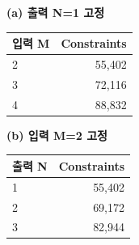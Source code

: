 \par\medskip\noindent
\begin{minipage}[t]{.49\linewidth}\centering
{\small\setlength{\tabcolsep}{3pt}\renewcommand{\arraystretch}{1.12}
\textbf{(a) 출력 N=1 고정}\par\smallskip
\begin{tabular}{@{}lr@{}}\toprule
\textbf{입력 M} & \textbf{Constraints} \\
\midrule
2 & 55,402 \\
3 & 72,116 \\
4 & 88,832 \\
\bottomrule\end{tabular}}
\end{minipage}\hfill
\begin{minipage}[t]{.49\linewidth}\centering
{\small\setlength{\tabcolsep}{3pt}\renewcommand{\arraystretch}{1.12}
\textbf{(b) 입력 M=2 고정}\par\smallskip
\begin{tabular}{@{}lr@{}}\toprule
\textbf{출력 N} & \textbf{Constraints} \\
\midrule
1 & 55,402 \\
2 & 69,172 \\
3 & 82,944 \\
\bottomrule\end{tabular}}
\end{minipage}
\par\medskip
